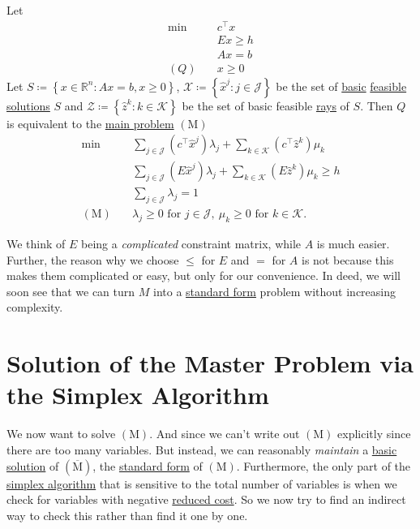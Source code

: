\begin{theorem}\label{thm:decomposition}
	Let
	\[
		\begin{aligned}
			\min~    & c^{\top}x \\
			         & Ex \geq h \\
			         & Ax = b    \\
			(Q)\quad & x\geq 0
		\end{aligned}
	\]
	Let \(S\coloneqq \left\{ x\in\mathbb{R}^n\colon Ax = b, x\geq 0 \right\}\), \(\mathcal{X} \coloneqq \left\{\hat{x}^j\colon j\in\mathcal{J} \right\}\) be the set of \hyperref[def:basic-solution]{basic} \hyperref[def:feasible-solution]{feasible solutions} \(S\) and \(\mathcal{Z} \coloneqq \left\{\hat{z}^k\colon k\in\mathcal{K} \right\}\) be the set of basic feasible \hyperref[def:ray]{rays} of \(S\). Then \(Q\) is equivalent to the \hyperref[def:main-problem]{main problem} \((\mathrm{M})\)
	\[
		\begin{aligned}
			\min~             & \sum\limits_{j\in\mathcal{J}}\left(c^{\top}\hat{x}^j\right)\lambda_{j} + \sum\limits_{k\in\mathcal{K}}\left(c^{\top} \hat{z}^k  \right)\mu_k \\
			                  & \sum\limits_{j\in\mathcal{J}}\left(E\hat{x}^j\right)\lambda_{j} + \sum\limits_{k\in\mathcal{K}}\left(E \hat{z}^k \right)\mu_k \geq h         \\
			                  & \sum\limits_{j\in\mathcal{J}}\lambda_{j} = 1                                                                                                 \\
			(\mathrm{M})\quad & \lambda_{j}\geq 0 \text{ for }j\in\mathcal{J},\ \mu_k\geq 0 \text{ for }k\in\mathcal{K}.
		\end{aligned}
	\]
\end{theorem}

\begin{remark}
	We think of \(E\) being a \emph{complicated} constraint matrix, while \(A\) is much easier. Further, the reason why we choose \(\leq \) for \(E\) and \(=\) for \(A\) is not because this makes them complicated or easy, but only for our convenience. In deed, we will soon see that we can turn \(M\) into a \hyperref[def:standard-form]{standard form} problem without increasing complexity.
\end{remark}

\section{Solution of the Master Problem via the Simplex Algorithm}
We now want to solve \((\mathrm{M})\). And since we can't write out \((\mathrm{M})\) explicitly since there are too many variables. But instead, we can reasonably \emph{maintain} a \hyperref[def:basic-solution]{basic solution} of \((\overline{\mathrm{M}})\), the \hyperref[def:standard-form]{standard form} of \((\mathrm{M})\). Furthermore, the only part of the \hyperref[algo:simplex-algorithm]{simplex algorithm} that is sensitive to the total number of variables is when we check for variables with negative \hyperref[def:reduced-cost]{reduced cost}. So we now try to find an indirect way to check this rather than find it one by one.


